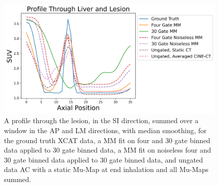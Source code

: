             \begin{figure}
                \centering
                
                \includegraphics[width=1.0\linewidth]{figures/motion_correction_2_results_1_profile.png}
                
                \captionsetup{singlelinecheck=false}
                \caption{
                    A profile through the lesion, in the \gls{SI} direction, summed over a window in the \gls{AP} and \gls{LM} directions, with median smoothing, for the ground truth \gls{XCAT} data, a \gls{MM} fit on four and $30$ gate binned data applied to $30$ gate binned data, a \gls{MM} fit on noiseless four and $30$ gate binned data applied to $30$ gate binned data, and ungated data \gls{AC} with a static \gls{Mu-Map} at end inhalation and all \glspl{Mu-Map} summed.
                }
                
                \label{fig:pet_ct_motion_correction_exploiting_motion_models_fit_on_coarsely_gated_data_applied_to_finely_gated_data_results_profile}
            \end{figure}
            
